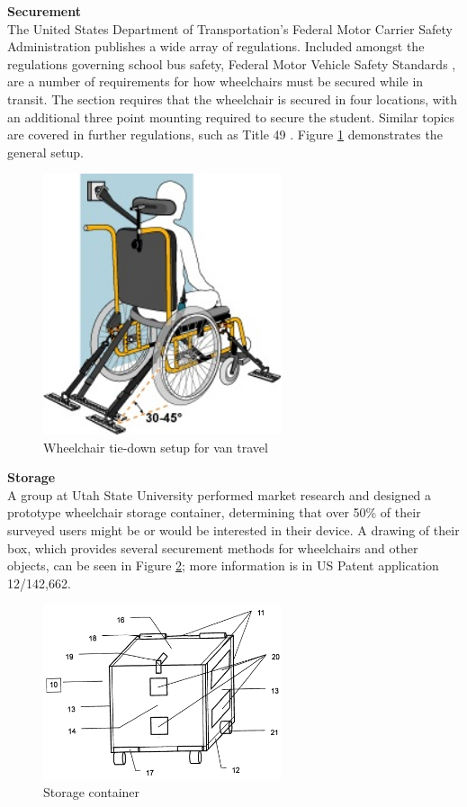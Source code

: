 \noindent\textbf{Securement}\\
The United States Department of Transportation's Federal Motor Carrier Safety Administration publishes a wide array of regulations. Included amongst the regulations governing school bus safety, Federal Motor Vehicle Safety Standards  \cite{fmvs222}, are a number of requirements for how wheelchairs must be secured while in transit. The section requires that the wheelchair is secured in four locations, with an additional three point mounting required to secure the student. Similar topics are covered in further regulations, such as Title 49  \cite{ecfr}. Figure \ref{fig:tie-down} demonstrates the general setup. \\

\begin{figure}[h]
  \centering
     \includegraphics[width=7cm]{images/wc_van.jpg}
   \caption{Wheelchair tie-down setup for van travel}
  \label{fig:tie-down}
\end{figure}

\noindent\textbf{Storage}\\
A group at Utah State University performed market research \cite{USU_survey} and designed a prototype wheelchair storage container, determining that over 50\% of their surveyed users might be or would be interested in their device. A drawing of their box, which provides several securement methods for wheelchairs and other objects, can be seen in Figure \ref{fig:USU_box}; more information is in US Patent application 12/142,662.\cite{USU_patent}

\begin{figure}[h]
  \centering
     \includegraphics[width=7cm]{images/USU_box.png}
   \caption{Storage container}
  \label{fig:USU_box}
\end{figure}

